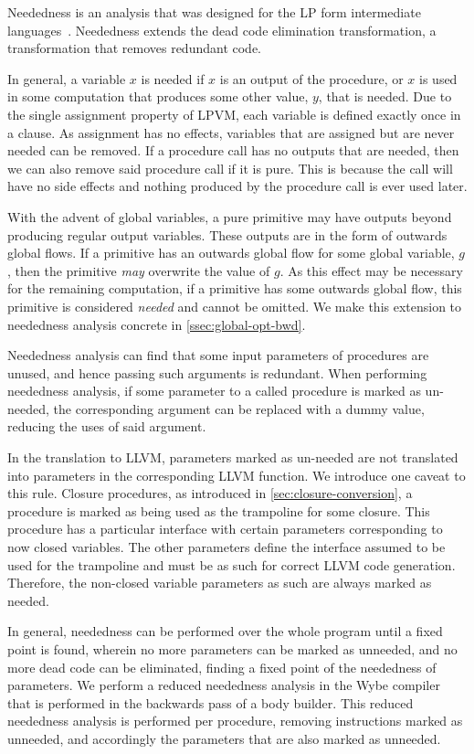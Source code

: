 Neededness is an analysis that was designed for the LP form intermediate languages~\cite{gange2015horn}. Neededness extends the dead code elimination transformation, a transformation that removes redundant code.

In general, a variable $x$ is needed if $x$ is an output of the procedure, or $x$ is used in some computation that produces some other value, $y$, that is needed. Due to the single assignment property of LPVM, each variable is defined exactly once in a clause. As assignment has no effects, variables that are assigned but are never needed can be removed. If a procedure call has no outputs that are needed, then we can also remove said procedure call if it is pure. This is because the call will have no side effects and nothing produced by the procedure call is ever used later.

With the advent of global variables, a pure primitive may have outputs beyond producing regular output variables. These outputs are in the form of outwards global flows. If a primitive has an outwards global flow for some global variable, $g$, then the primitive \textit{may} overwrite the value of $g$. As this effect may be necessary for the remaining computation, if a primitive has some outwards global flow, this primitive is considered \textit{needed} and cannot be omitted. We make this extension to neededness analysis concrete in \cref{ssec:global-opt-bwd}.

Neededness analysis can find that some input parameters of procedures are unused, and hence passing such arguments is redundant. When performing neededness analysis, if some parameter to a called procedure is marked as un-needed, the corresponding argument can be replaced with a dummy value, reducing the uses of said argument. 

In the translation to LLVM, parameters marked as un-needed are not translated into parameters in the corresponding LLVM function. We introduce one caveat to this rule. Closure procedures, as introduced in \cref{sec:closure-conversion}, a procedure is marked as being used as the trampoline for some closure. This procedure has a particular interface with certain parameters corresponding to now closed variables. The other parameters define the interface assumed to be used for the trampoline and must be as such for correct LLVM code generation. Therefore, the non-closed variable parameters as such are always marked as needed.

In general, neededness can be performed over the whole program until a fixed point is found, wherein no more parameters can be marked as unneeded, and no more dead code can be eliminated, finding a fixed point of the neededness of parameters. We perform a reduced neededness analysis in the Wybe compiler that is performed in the backwards pass of a body builder. This reduced neededness analysis is performed per procedure, removing instructions marked as unneeded, and accordingly the parameters that are also marked as unneeded. 

